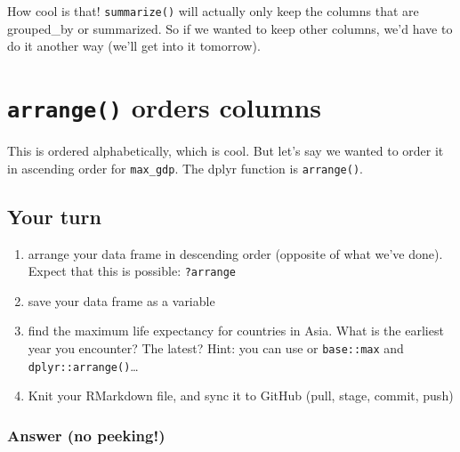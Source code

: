 \documentclass[]{book}
\newenvironment{Shaded}{\begin{snugshade}}{\end{snugshade}}
\newcommand{\KeywordTok}[1]{\textcolor[rgb]{0.13,0.29,0.53}{\textbf{{#1}}}}
\newcommand{\DataTypeTok}[1]{\textcolor[rgb]{0.13,0.29,0.53}{{#1}}}
\newcommand{\StringTok}[1]{\textcolor[rgb]{0.31,0.60,0.02}{{#1}}}
\newcommand{\NormalTok}[1]{{#1}}
\providecommand{\tightlist}{%
  \setlength{\itemsep}{0pt}\setlength{\parskip}{0pt}}
\theoremstyle{definition}
\theoremstyle{definition}
\theoremstyle{definition}
\theoremstyle{remark}
\begin{document}
How cool is that! \texttt{summarize()} will actually only keep the
columns that are grouped\_by or summarized. So if we wanted to keep
other columns, we'd have to do it another way (we'll get into it
tomorrow).

\section{\texorpdfstring{\texttt{arrange()} orders
columns}{arrange() orders columns}}\label{arrange-orders-columns}

This is ordered alphabetically, which is cool. But let's say we wanted
to order it in ascending order for \texttt{max\_gdp}. The dplyr function
is \texttt{arrange()}.

\begin{Shaded}
\end{Shaded}

\subsection{Your turn}\label{your-turn-7}

\begin{enumerate}
\def\labelenumi{\arabic{enumi}.}
\tightlist
\item
  arrange your data frame in descending order (opposite of what we've
  done). Expect that this is possible: \texttt{?arrange}
\item
  save your data frame as a variable
\item
  find the maximum life expectancy for countries in Asia. What is the
  earliest year you encounter? The latest? Hint: you can use or
  \texttt{base::max} and \texttt{dplyr::arrange()}\ldots{}
\item
  Knit your RMarkdown file, and sync it to GitHub (pull, stage, commit,
  push)
\end{enumerate}

\subsubsection{Answer (no peeking!)}\label{answer-no-peeking}
\end{document}
